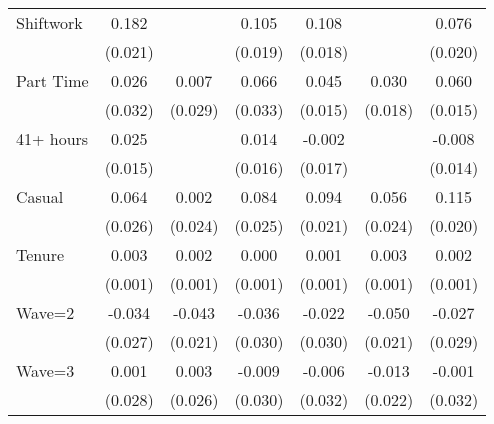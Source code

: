 {\begin{tabular}{l*{6}{c}}
Shiftwork           &       0.182\sym{***}&                     &       0.105\sym{***}&       0.108\sym{***}&                     &       0.076\sym{***}\\
                    &     (0.021)         &                     &     (0.019)         &     (0.018)         &                     &     (0.020)         \\
Part Time           &       0.026         &       0.007         &       0.066\sym{**} &       0.045\sym{***}&       0.030\sym{*}  &       0.060\sym{***}\\
                    &     (0.032)         &     (0.029)         &     (0.033)         &     (0.015)         &     (0.018)         &     (0.015)         \\
41+ hours           &       0.025         &                     &       0.014         &      -0.002         &                     &      -0.008         \\
                    &     (0.015)         &                     &     (0.016)         &     (0.017)         &                     &     (0.014)         \\
Casual              &       0.064\sym{**} &       0.002         &       0.084\sym{***}&       0.094\sym{***}&       0.056\sym{**} &       0.115\sym{***}\\
                    &     (0.026)         &     (0.024)         &     (0.025)         &     (0.021)         &     (0.024)         &     (0.020)         \\
Tenure              &       0.003\sym{**} &       0.002\sym{**} &       0.000         &       0.001         &       0.003\sym{***}&       0.002\sym{**} \\
                    &     (0.001)         &     (0.001)         &     (0.001)         &     (0.001)         &     (0.001)         &     (0.001)         \\
Wave=2              &      -0.034         &      -0.043\sym{**} &      -0.036         &      -0.022         &      -0.050\sym{**} &      -0.027         \\
                    &     (0.027)         &     (0.021)         &     (0.030)         &     (0.030)         &     (0.021)         &     (0.029)         \\
Wave=3              &       0.001         &       0.003         &      -0.009         &      -0.006         &      -0.013         &      -0.001         \\
                    &     (0.028)         &     (0.026)         &     (0.030)         &     (0.032)         &     (0.022)         &     (0.032)         \\

\end{tabular}}
